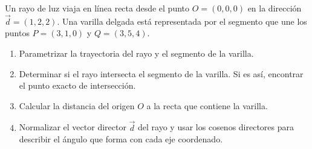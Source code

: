 Un rayo de luz viaja en línea recta desde el punto $O = (0, 0, 0)$ en la dirección $\vec{d} = (1, 2, 2)$. Una varilla delgada está representada por el segmento que une los puntos $P = (3, 1, 0)$ y $Q = (3, 5, 4)$.
\begin{enumerate}
    \item Parametrizar la trayectoria del rayo y el segmento de la varilla.
    \item Determinar si el rayo intersecta el segmento de la varilla. Si es así, encontrar el punto exacto de intersección.
    \item Calcular la distancia del origen $O$ a la recta que contiene la varilla.
    \item Normalizar el vector director $\vec{d}$ del rayo y usar los cosenos directores para describir el ángulo que forma con cada eje coordenado.
\end{enumerate}